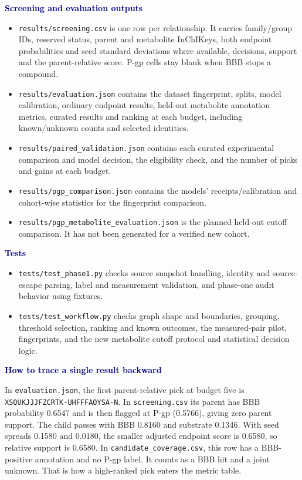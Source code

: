\documentclass[11pt,a4paper]{article}
\newcommand{\code}[1]{\nolinkurl{#1}}
\newcommand{\lead}[1]{\par\smallskip\textbf{\textcolor{Navy}{#1}}\par\nobreak}
\newenvironment{compact}{\begin{itemize}[leftmargin=*,topsep=2pt,itemsep=1pt,parsep=0pt]}{\end{itemize}}
\begin{document}
\lead{Screening and evaluation outputs}
\begin{compact}
\item \code{results/screening.csv} is one row per relationship. It carries family/group IDs, reserved status, parent and metabolite InChIKeys, both endpoint probabilities and seed standard deviations where available, decisions, support and the parent-relative score. P-gp cells stay blank when BBB stops a compound.
\item \code{results/evaluation.json} contains the dataset fingerprint, splits, model calibration, ordinary endpoint results, held-out metabolite annotation metrics, curated results and ranking at each budget, including known/unknown counts and selected identities.
\item \code{results/paired_validation.json} contains each curated experimental comparison and model decision, the eligibility check, and the number of picks and gains at each budget.
\item \code{results/pgp_comparison.json} contains the models' receipts/calibration and cohort-wise statistics for the fingerprint comparison.
\item \code{results/pgp_metabolite_evaluation.json} is the planned held-out cutoff comparison. It has not been generated for a verified new cohort.
\end{compact}

\lead{Tests}
\begin{compact}
\item \code{tests/test_phase1.py} checks source snapshot handling, identity and source-escape parsing, label and measurement validation, and phase-one audit behavior using fixtures.
\item \code{tests/test_workflow.py} checks graph shape and boundaries, grouping, threshold selection, ranking and known outcomes, the measured-pair pilot, fingerprints, and the new metabolite cutoff protocol and statistical decision logic.
\end{compact}

\lead{How to trace a single result backward}
In \code{evaluation.json}, the first parent-relative pick at budget five is \code{XSQUKJJJFZCRTK-UHFFFAOYSA-N}. In \code{screening.csv} its parent has BBB probability 0.6547 and is then flagged at P-gp (0.5766), giving zero parent support. The child passes with BBB 0.8160 and substrate 0.1346. With seed spreads 0.1580 and 0.0180, the smaller adjusted endpoint score is 0.6580, so relative support is 0.6580. In \code{candidate_coverage.csv}, this row has a BBB-positive annotation and no P-gp label. It counts as a BBB hit and a joint unknown. That is how a high-ranked pick enters the metric table.
\end{document}
